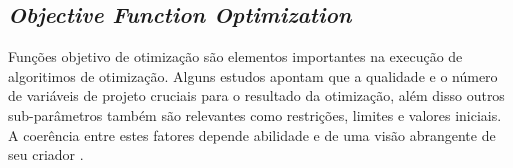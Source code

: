 \subsection{\textit{Objective Function Optimization}}
Funções objetivo de otimização são elementos importantes na execução de algoritimos
de otimização. Alguns estudos apontam que a qualidade e o número de variáveis de
projeto cruciais para o resultado da otimização, além disso outros sub-parâmetros
também são relevantes como restrições, limites e valores iniciais. A coerência entre
estes fatores depende abilidade e de uma visão abrangente de seu criador \cite{albaghdadi21}.

